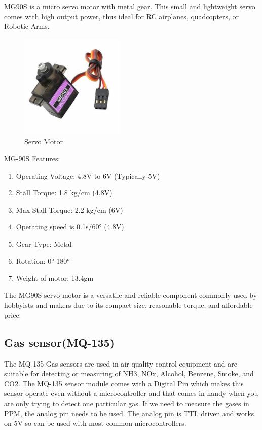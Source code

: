 \documentclass[conference]{IEEEtran}
\begin{document}
MG90S is a micro servo motor with metal gear. This small and lightweight servo comes with high output power, thus ideal for  RC airplanes, quadcopters, or Robotic Arms.
\begin{figure}[th]
    \centering
    \includegraphics[height=5cm,width=\linewidth]{images/servo motor.jpg}
    \caption{Servo Motor}
    \label{fig:enter-label}
\end{figure}
MG-90S Features:
\begin{enumerate}
    \item Operating Voltage: 4.8V to 6V (Typically 5V)
    \item Stall Torque: 1.8 kg/cm (4.8V)
    \item Max Stall Torque: 2.2 kg/cm (6V)
    \item Operating speed is 0.1s/60° (4.8V)
    \item Gear Type: Metal
    \item Rotation: 0°-180°
    \item Weight of motor: 13.4gm
\end{enumerate}
The MG90S servo motor is a versatile and reliable component commonly used by hobbyists and makers due to its compact size, reasonable torque, and affordable price.


\subsection{Gas sensor(MQ-135)}

The MQ-135 Gas sensors are used in air quality control equipment and are suitable for detecting or measuring of NH3, NOx, Alcohol, Benzene, Smoke, and CO2. The MQ-135 sensor module comes with a Digital Pin which makes this sensor operate even without a microcontroller and that comes in handy when you are only trying to detect one particular gas. If we need to measure the gases in PPM, the analog pin needs to be used. The analog pin is TTL driven and works on 5V so can be used with most common microcontrollers.
\end{document}
